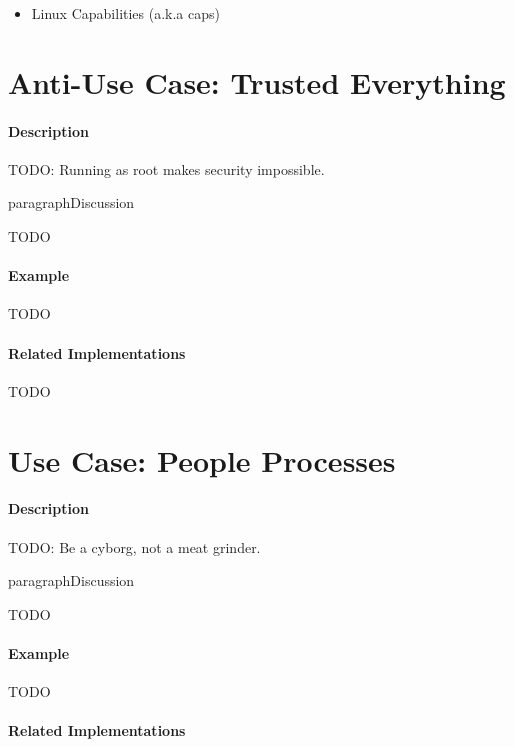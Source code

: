 \begin{itemize}
	\item Linux\texttrademark{} Capabilities (a.k.a \textsf{caps})
\end{itemize}

\section{Anti-Use Case: Trusted Everything}

\paragraph{Description}

{\Large TODO:} Running as root makes security impossible.

paragraph{Discussion}

{\Large TODO}

\paragraph{Example}

{\Large TODO}

\paragraph{Related Implementations}

{\Large TODO}

\section{Use Case: People Processes}

\paragraph{Description}

{\Large TODO:} Be a cyborg, not a meat grinder.

paragraph{Discussion}

{\Large TODO}

\paragraph{Example}

{\Large TODO}

\paragraph{Related Implementations}

